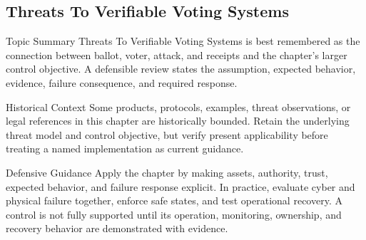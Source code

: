 \documentclass[11pt,letterpaper]{article}
\begin{document}
\subsection*{Threats To Verifiable Voting Systems}
\begin{CornellNotesTable}
\end{CornellNotesTable}
\begin{CornellSummaryBox}{Topic Summary}
Threats To Verifiable Voting Systems is best remembered as the connection between ballot, voter, attack, and receipts and the chapter's larger control objective. A defensible review states the assumption, expected behavior, evidence, failure consequence, and required response.
\end{CornellSummaryBox}
\begin{CornellWarningBox}{Historical Context}
Some products, protocols, examples, threat observations, or legal references in this chapter are historically bounded. Retain the underlying threat model and control objective, but verify present applicability before treating a named implementation as current guidance.
\end{CornellWarningBox}
\begin{CornellOverviewBox}{Defensive Guidance}
Apply the chapter by making assets, authority, trust, expected behavior, and failure response explicit. In practice, evaluate cyber and physical failure together, enforce safe states, and test operational recovery. A control is not fully supported until its operation, monitoring, ownership, and recovery behavior are demonstrated with evidence.
\end{CornellOverviewBox}
\end{document}
